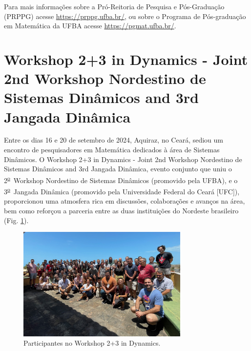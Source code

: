 \documentclass{hipatia}
\newcommand{\superau}{\textsuperscript{\underline{a}}~}
\newcommand{\superou}{\textsuperscript{\underline{o}}~}
\begin{document}

Para mais informações sobre a Pró-Reitoria de Pesquisa e Pós-Graduação (PRPPG) acesse
 \href{https://prppg.ufba.br/}{https://prppg.ufba.br/}, ou sobre o Programa de Pós-graduação em Matemática da UFBA acesse \href{https://pgmat.ufba.br/}{https://pgmat.ufba.br/}.
 


\section{Workshop 2+3 in Dynamics - Joint 2nd Workshop Nordestino de Sistemas Dinâmicos and 3rd Jangada Dinâmica}



Entre os dias 16 e 20 de setembro de 2024, Aquiraz, no Ceará, sediou um encontro de pesquisadores em Matemática dedicados à área de Sistemas Dinâmicos. O Workshop 2+3 in Dynamics - Joint 2nd Workshop Nordestino de Sistemas Dinâmicos and 3rd Jangada Dinâmica, evento conjunto que uniu o 2\superou Workshop Nordestino de Sistemas Dinâmicos (promovido pela UFBA), e o 3\superou Jangada Dinâmica (promovido pela Universidade Federal do Ceará [UFC]),  proporcionou uma atmosfera rica em discussões, colaborações e avanços na área, bem como reforçou a parceria entre as duas instituições do Nordeste brasileiro (Fig. \ref{workshop2}).

\begin{figure}[htb]
    \centering
    \includegraphics[width=8.5cm]{Workshop2.jpg}
    \caption{Participantes no Workshop 2+3 in Dynamics.}
 \label{workshop2}
\end{figure}
\end{document}
